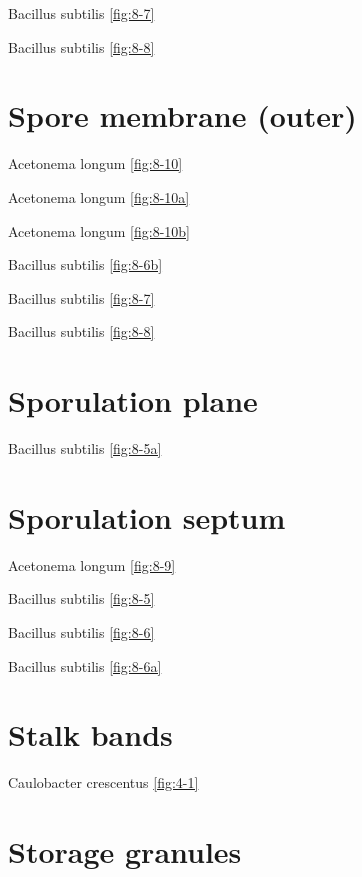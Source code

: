 \documentclass[]{tufte-book}
\begin{document}
Bacillus subtilis \ref{fig:8-7}

Bacillus subtilis \ref{fig:8-8}

\hypertarget{spore-membrane-outer}{%
\section*{Spore membrane (outer)}\label{spore-membrane-outer}}

Acetonema longum \ref{fig:8-10}

Acetonema longum \ref{fig:8-10a}

Acetonema longum \ref{fig:8-10b}

Bacillus subtilis \ref{fig:8-6b}

Bacillus subtilis \ref{fig:8-7}

Bacillus subtilis \ref{fig:8-8}

\hypertarget{sporulation-plane}{%
\section*{Sporulation plane}\label{sporulation-plane}}

Bacillus subtilis \ref{fig:8-5a}

\hypertarget{sporulation-septum}{%
\section*{Sporulation septum}\label{sporulation-septum}}

Acetonema longum \ref{fig:8-9}

Bacillus subtilis \ref{fig:8-5}

Bacillus subtilis \ref{fig:8-6}

Bacillus subtilis \ref{fig:8-6a}

\hypertarget{stalk-bands-1}{%
\section*{Stalk bands}\label{stalk-bands-1}}

Caulobacter crescentus \ref{fig:4-1}

\hypertarget{storage-granules}{%
\section*{Storage granules}\label{storage-granules}}
\end{document}
